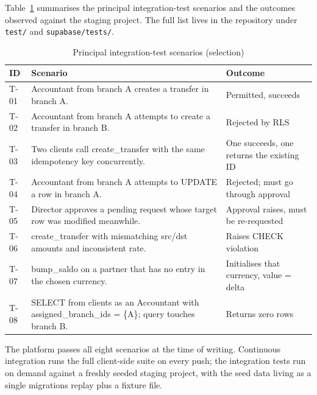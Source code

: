 Table~\ref{tab:integration} summarises the principal integration-test scenarios and the outcomes observed against the staging project. The full list lives in the repository under \texttt{test/} and \texttt{supabase/tests/}.

{\singlespacing
\begin{table}[h]
  \caption{Principal integration-test scenarios (selection)}
  \label{tab:integration}
  \centering
  \begin{tabular}{p{1.2cm}p{8.5cm}p{3cm}}
    \toprule
    \textbf{ID} & \textbf{Scenario}                                                                          & \textbf{Outcome}\\
    \midrule
    T-01 & Accountant from branch A creates a transfer in branch A.                                         & Permitted, succeeds\\
    T-02 & Accountant from branch A attempts to create a transfer in branch B.                              & Rejected by RLS\\
    T-03 & Two clients call create\_transfer with the same idempotency key concurrently.                    & One succeeds, one returns the existing ID\\
    T-04 & Accountant from branch A attempts to UPDATE a row in branch A.                                   & Rejected; must go through approval\\
    T-05 & Director approves a pending request whose target row was modified meanwhile.                     & Approval raises, must be re-requested\\
    T-06 & create\_transfer with mismatching src/dst amounts and inconsistent rate.                         & Raises CHECK violation\\
    T-07 & bump\_saldo on a partner that has no entry in the chosen currency.                               & Initialises that currency, value = delta\\
    T-08 & SELECT from clients as an Accountant with assigned\_branch\_ids = \{A\}; query touches branch B. & Returns zero rows\\
    \bottomrule
  \end{tabular}
\end{table}
}

The platform passes all eight scenarios at the time of writing. Continuous integration runs the full client-side suite on every push; the integration tests run on demand against a freshly seeded staging project, with the seed data living as a single migrations replay plus a fixture file.

